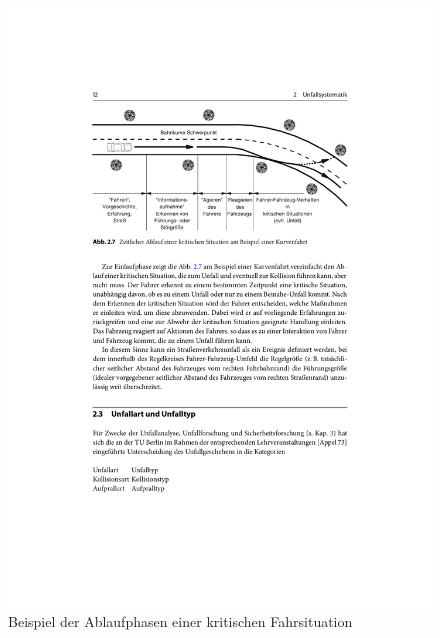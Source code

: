 \begin{figure}[htpb]
	\centering
	\includegraphics[width=\linewidth]{Bilder/Unfallforschung_2.pdf}
	\caption{Beispiel der Ablaufphasen einer kritischen Fahrsituation \citep{Appel2002}}
	\label{fig:BeispielZeitlichePhasenEinesUnfalls}
\end{figure}

%
%
%
%
%

